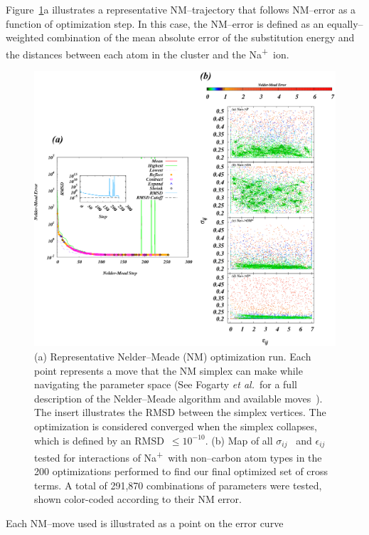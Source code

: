 \documentclass[12pt,openany,final]{book}
\newcommand{\etal}{\textit{et al.}}
\newcommand{\sigmaij}{$\sigma_{ij}$}
\newcommand{\epsilonij}{$\epsilon_{ij}$}
\newcommand{\na}{Na\textsuperscript{+}}
\begin{document}
Figure~\ref{fig:nmerror}a illustrates a representative
NM--trajectory that follows NM--error as a function of optimization step. In this case, the NM--error is
defined as an
equally--weighted combination of the mean absolute error of the
substitution energy and the distances between each atom in the cluster and the \na~ion. 
\begin{figure}[h!]
    \caption[Representative Nelder--Meade (NM) optimization run]{
    (a) Representative Nelder--Meade (NM) optimization run. Each point
    represents a move that the NM simplex can make while navigating the parameter space 
    (See Fogarty \etal~for a full description of the
    Nelder--Meade algorithm and available moves~\cite{fogarty:2014:paropt}). The insert illustrates the 
    RMSD between the simplex vertices.
    The optimization is considered converged when the simplex collapses, which is defined by an RMSD~$\leq 10^{-10}$.
    (b) Map of all \sigmaij~ and \epsilonij~ tested for interactions of \na~with non--carbon atom types 
    in the 200 optimizations performed to find our final optimized set of cross terms. A total of
291,870 combinations of parameters were tested, shown color-coded according to their NM error.}
    \label{fig:nmerror}
    \includegraphics[width=\textwidth,trim=-3cm 0 0 -3cm]{figure_2_ch1.eps}
\end{figure}
Each NM--move used is illustrated
as a point on the error curve 
\end{document}
